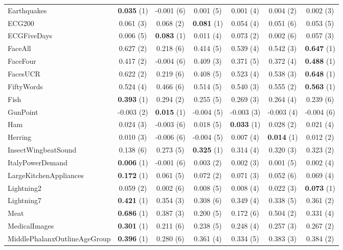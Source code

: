 \begin{table}[ht]
\begin{adjustbox}{width=\textwidth}
\begin{tabular}{lcccccc}
    Earthquakes & \textbf{0.035} (1) & -0.001 (6) & 0.001 (5) & 0.001 (4) & 0.004 (2) & 0.002 (3) \\
    ECG200 & 0.061 (3) & 0.068 (2) & \textbf{0.081} (1) & 0.054 (4) & 0.051 (6) & 0.053 (5) \\
    ECGFiveDays & 0.006 (5) & \textbf{0.083} (1) & 0.011 (4) & 0.073 (2) & 0.002 (6) & 0.057 (3) \\
    FaceAll & 0.627 (2) & 0.218 (6) & 0.414 (5) & 0.539 (4) & 0.542 (3) & \textbf{0.647} (1) \\
    FaceFour & 0.417 (2) & -0.004 (6) & 0.409 (3) & 0.371 (5) & 0.372 (4) & \textbf{0.488} (1) \\
    FacesUCR & 0.622 (2) & 0.219 (6) & 0.408 (5) & 0.523 (4) & 0.538 (3) & \textbf{0.648} (1) \\
    FiftyWords & 0.524 (4) & 0.466 (6) & 0.514 (5) & 0.540 (3) & 0.555 (2) & \textbf{0.563} (1) \\
    Fish & \textbf{0.393} (1) & 0.294 (2) & 0.255 (5) & 0.269 (3) & 0.264 (4) & 0.239 (6) \\
    GunPoint & -0.003 (2) & \textbf{0.015} (1) & -0.004 (5) & -0.003 (3) & -0.003 (4) & -0.004 (6) \\
    Ham & 0.024 (3) & -0.003 (6) & 0.018 (5) & \textbf{0.033} (1) & 0.028 (2) & 0.021 (4) \\
    Herring & 0.010 (3) & -0.006 (6) & -0.004 (5) & 0.007 (4) & \textbf{0.014} (1) & 0.012 (2) \\
    InsectWingbeatSound & 0.138 (6) & 0.273 (5) & \textbf{0.325} (1) & 0.314 (4) & 0.320 (3) & 0.323 (2) \\
    ItalyPowerDemand & \textbf{0.006} (1) & -0.001 (6) & 0.003 (2) & 0.002 (3) & 0.001 (5) & 0.002 (4) \\
    LargeKitchenAppliances & \textbf{0.172} (1) & 0.061 (5) & 0.072 (2) & 0.071 (3) & 0.052 (6) & 0.069 (4) \\
    Lightning2 & 0.059 (2) & 0.002 (6) & 0.008 (5) & 0.008 (4) & 0.022 (3) & \textbf{0.073} (1) \\
    Lightning7 & \textbf{0.421} (1) & 0.354 (3) & 0.308 (6) & 0.349 (4) & 0.338 (5) & 0.361 (2) \\
    Meat & \textbf{0.686} (1) & 0.387 (3) & 0.200 (5) & 0.172 (6) & 0.504 (2) & 0.331 (4) \\
    MedicalImages & \textbf{0.301} (1) & 0.211 (6) & 0.238 (5) & 0.248 (4) & 0.257 (3) & 0.267 (2) \\
    MiddlePhalanxOutlineAgeGroup & \textbf{0.396} (1) & 0.280 (6) & 0.361 (4) & 0.334 (5) & 0.383 (3) & 0.384 (2) \\

\end{tabular}
\end{adjustbox}
\end{table}
